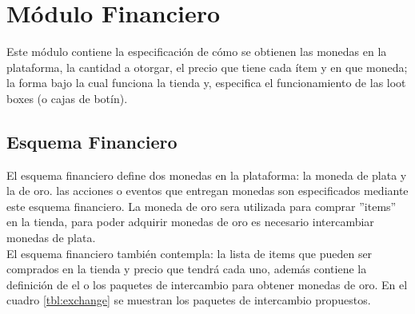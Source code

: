 \chapter{Módulo Financiero}
\label{mod:financiero}

    Este módulo contiene la especificación de %
    cómo se obtienen las monedas en la plataforma, la cantidad a otorgar, el precio que tiene cada ítem y en que moneda; la forma bajo la cual funciona la tienda y, especifica el funcionamiento de las loot boxes (o cajas de botín).

\section{Esquema Financiero}

    El esquema financiero define dos monedas en la plataforma: la moneda de plata y la de oro. las acciones o eventos que entregan monedas son especificados mediante este esquema financiero. La moneda de oro sera utilizada para comprar ''items''  en la tienda, para poder adquirir monedas de oro es necesario intercambiar monedas de plata.\\

    \noindent El esquema financiero también contempla: la lista de items que pueden ser comprados en la tienda y precio que tendrá cada uno, además contiene la definición de el o los paquetes de intercambio para obtener monedas de oro. En el cuadro \ref{tbl:exchange} se muestran los paquetes de intercambio propuestos.




